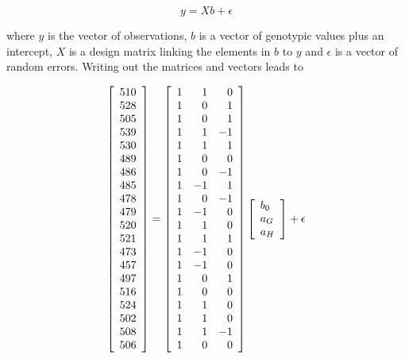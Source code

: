 \documentclass[]{book}
\theoremstyle{definition}
\theoremstyle{definition}
\theoremstyle{definition}
\theoremstyle{remark}
\begin{document}
\begin{equation}
  y = Xb + \epsilon
  \label{eq:flemsnp}
\end{equation}

where \(y\) is the vector of observations, \(b\) is a vector of genotypic values plus an intercept, \(X\) is a design matrix linking the elements in \(b\) to \(y\) and \(\epsilon\) is a vector of random errors. Writing out the matrices and vectors leads to

\begin{equation}
\left[\begin{array}{r}
  510 \\ 
  528 \\ 
  505 \\ 
  539 \\ 
  530 \\ 
  489 \\ 
  486 \\ 
  485 \\ 
  478 \\ 
  479 \\ 
  520 \\ 
  521 \\ 
  473 \\ 
  457 \\ 
  497 \\ 
  516 \\ 
  524 \\ 
  502 \\ 
  508 \\ 
  506 \\ 
  \end{array} 
\right]
 = 
\left[\begin{array}{rrr}
  1 & 1 & 0 \\ 
  1 & 0 & 1 \\ 
  1 & 0 & 1 \\ 
  1 & 1 & -1 \\ 
  1 & 1 & 1 \\ 
  1 & 0 & 0 \\ 
  1 & 0 & -1 \\ 
  1 & -1 & 1 \\ 
  1 & 0 & -1 \\ 
  1 & -1 & 0 \\ 
  1 & 1 & 0 \\ 
  1 & 1 & 1 \\ 
  1 & -1 & 0 \\ 
  1 & -1 & 0 \\ 
  1 & 0 & 1 \\ 
  1 & 0 & 0 \\ 
  1 & 1 & 0 \\ 
  1 & 1 & 0 \\ 
  1 & 1 & -1 \\ 
  1 & 0 & 0 \\ 
  \end{array} 
\right]
\left[\centering
\begin{array}{l}
  b_0 \\ 
  a_G \\ 
  a_H \\ 
  \end{array} 
\right]
 + \epsilon\end{equation}
\end{document}
